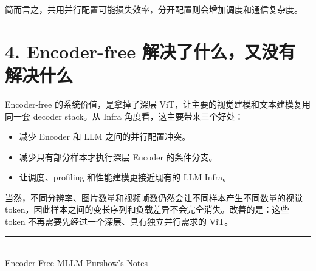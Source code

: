 \documentclass[11pt,a4paper]{article}
\begin{document}
简而言之，共用并行配置可能损失效率，分开配置则会增加调度和通信复杂度。

\clearpage
\section{4. Encoder-free 解决了什么，又没有解决什么}
\color{ink}

Encoder-free 的系统价值，是拿掉了深层 ViT，让主要的视觉建模和文本建模复用同一套 decoder stack。从 Infra 角度看，这主要带来三个好处：

\begin{itemize}
  \item 减少 Encoder 和 LLM 之间的并行配置冲突。
  \item 减少只有部分样本才执行深层 Encoder 的条件分支。
  \item 让调度、profiling 和性能建模更接近现有的 LLM Infra。
\end{itemize}

当然，不同分辨率、图片数量和视频帧数仍然会让不同样本产生不同数量的视觉 token，因此样本之间的变长序列和负载差异不会完全消失。改善的是：这些 token 不再需要先经过一个深层、具有独立并行需求的 ViT。

\vfill
{\color{rule}\rule{\linewidth}{0.5pt}}\\[-0.1em]
{\footnotesize\sffamily\color{muted}Encoder-Free MLLM \textperiodcentered{} Purshow's Notes}
\end{document}
